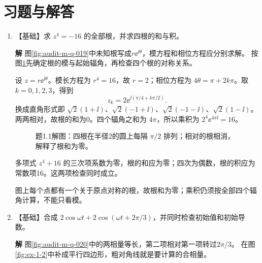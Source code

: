\documentclass[11pt,openany,fontset=fandol]{ctexbook}
\theoremstyle{plain}\newtheorem{theorem}{定理}[chapter]\newtheorem{proposition}[theorem]{命题}
\theoremstyle{definition}\newtheorem{definition}{定义}[chapter]\newtheorem{example}{例}[chapter]
\theoremstyle{remark}\newtheorem*{remark}{说明}
\newcommand{\SolutionStart}{\par\nobreak\medskip\nobreak\noindent\textbf{解}\quad\ignorespaces}
\newenvironment{solution}{\SolutionStart}{\par\medskip}
\begin{document}
\clearpage
\section*{习题与解答}
\begin{enumerate}[label=1.\arabic*]
\item \begin{minipage}[t]{\linewidth}
【基础】求 $z^4=-16$ 的全部根，并求四根的和与积。
\end{minipage}

\begin{solution}
图\ref{fig:audit-m-q-019}中未知根写成$r\ee^{\ii\theta}$，模方程和相位方程应分别求解。
按图\ref{fig:hw-1-1}先确定根的模与起始辐角，再检查四个根的对称关系。

设 $z=r\ee^{\ii\theta}$。模长方程为 $r^4=16$，故 $r=2$；相位方程为 $4\theta=\pi+2k\pi$。取 $k=0,1,2,3$，得到
\[
z_k=2\ee^{\ii(\pi/4+k\pi/2)}.
\]
换成直角形式即 $\sqrt2(1+\ii)$、$\sqrt2(-1+\ii)$、$\sqrt2(-1-\ii)$、$\sqrt2(1-\ii)$。两两相对，故根的和为0。四个辐角之和为 $4\pi$，所以乘积为 $2^4\ee^{4\pi\ii}=16$。

\begin{figure}[H]\centering
{}
\caption{题1.1解图：四根在半径2的圆上每隔 $\pi/2$ 排列；相对的根相消，解释了根和为零。}\label{fig:hw-1-1}
\end{figure}

多项式 $z^4+16$ 的三次项系数为零，根的和应为零；四次为偶数，根的积应为常数项16。这两项检查同时成立。

图上每个点都有一个关于原点对称的根，故根和为零；乘积仍须按全部四个辐角计算，不能只看模。
\end{solution}

\item \begin{minipage}[t]{\linewidth}
【基础】合成 $2\cos\omega t+2\cos(\omega t+2\pi/3)$，并同时检查初始值和初始导数。

\end{minipage}

\begin{solution}
图\ref{fig:audit-m-q-020}中的两相量等长，第二项相对第一项转过$2\pi/3$。
在图\ref{fig:ex-1-2}中补成平行四边形，粗对角线就是要计算的合相量。


\end{solution}
\end{enumerate}
\end{document}
